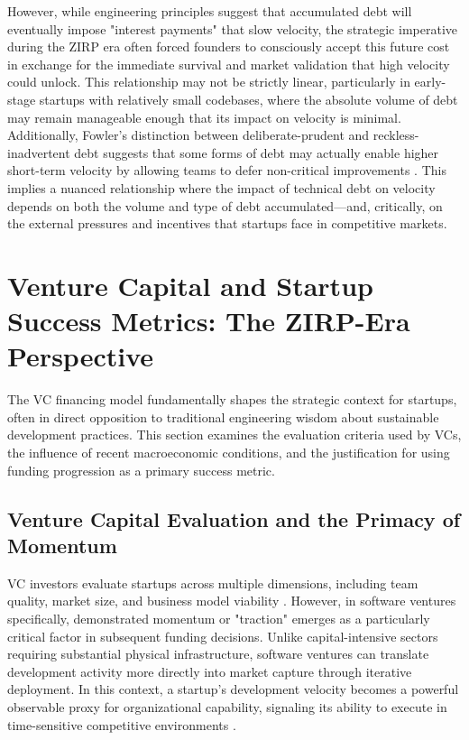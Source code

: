 However, while engineering principles suggest that accumulated debt will eventually impose "interest payments" that slow velocity, the strategic imperative during the ZIRP era often forced founders to consciously accept this future cost in exchange for the immediate survival and market validation that high velocity could unlock. This relationship may not be strictly linear, particularly in early-stage startups with relatively small codebases, where the absolute volume of debt may remain manageable enough that its impact on velocity is minimal. Additionally, Fowler's distinction between deliberate-prudent and reckless-inadvertent debt suggests that some forms of debt may actually enable higher short-term velocity by allowing teams to defer non-critical improvements \citep{fowler2009technical}. This implies a nuanced relationship where the impact of technical debt on velocity depends on both the volume and type of debt accumulated—and, critically, on the external pressures and incentives that startups face in competitive markets.

\section{Venture Capital and Startup Success Metrics: The ZIRP-Era Perspective}\label{sec:vc_literature}

The \ac{VC} financing model fundamentally shapes the strategic context for startups, often in direct opposition to traditional engineering wisdom about sustainable development practices. This section examines the evaluation criteria used by \ac{VC}s, the influence of recent macroeconomic conditions, and the justification for using funding progression as a primary success metric.

\subsection{Venture Capital Evaluation and the Primacy of Momentum}\label{sec:vc_momentum}

\ac{VC} investors evaluate startups across multiple dimensions, including team quality, market size, and business model viability \citep{gompers2001venture}. However, in software ventures specifically, demonstrated momentum or "traction" emerges as a particularly critical factor in subsequent funding decisions. Unlike capital-intensive sectors requiring substantial physical infrastructure, software ventures can translate development activity more directly into market capture through iterative deployment. In this context, a startup's development velocity becomes a powerful observable proxy for organizational capability, signaling its ability to execute in time-sensitive competitive environments \citep{lee2024startups}.

